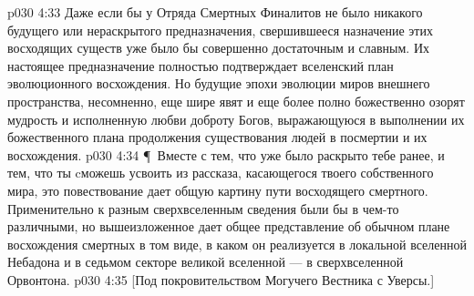 \vs p030 4:33 Даже если бы у Отряда Смертных Финалитов не было никакого будущего или нераскрытого предназначения, свершившееся назначение этих восходящих существ уже было бы совершенно достаточным и славным. Их настоящее предназначение полностью подтверждает вселенский план эволюционного восхождения. Но будущие эпохи эволюции миров внешнего пространства, несомненно, еще шире явят и еще более полно божественно озорят мудрость и исполненную любви доброту Богов, выражающуюся в выполнении их божественного плана продолжения существования людей в посмертии и их восхождения.
\vs p030 4:34 \P\ Вместе с тем, что уже было раскрыто тебе ранее, и тем, что ты cможешь усвоить из рассказа, касающегося твоего собственного мира, это повествование дает общую картину пути восходящего смертного. Применительно к разным сверхвселенным сведения были бы в чем\hyp{}то различными, но вышеизложенное дает общее представление об обычном плане восхождения смертных в том виде, в каком он реализуется в локальной вселенной Небадона и в седьмом секторе великой вселенной --- в сверхвселенной Орвонтона.
\vs p030 4:35 [Под покровительством Могучего Вестника с Уверсы.]
